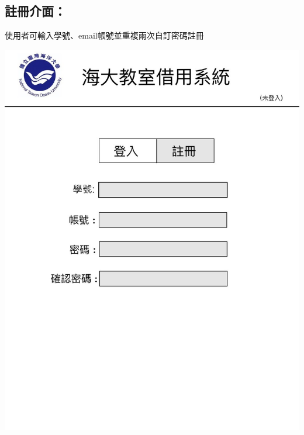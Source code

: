 \documentclass{article}
\begin{document}
\begin{minipage}{0.6\linewidth}
	\subsection*{註冊介面：}使用者可輸入學號、email帳號並重複兩次自訂密碼註冊
\end{minipage}
\begin{minipage}{0.4\linewidth}
	\includegraphics[height=0.4\textheight]{Regester_GUI.jpg}
\end{minipage}

\newpage
\end{document}

